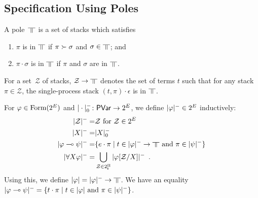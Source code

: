 \subsection{Specification Using Poles}


\begin{definition}
 \label{ex:def:pole}
A pole~$\bbot$ is a set of stacks
which satisfies
\begin{enumerate}
 \item \label{ex:red-closed} $\pi$ is in $\bbot$ if $\pi\succ \sigma$ and
       $\sigma\in\bbot$; and
 \item \label{ex:conc-closed} $\pi\cdot \sigma$ is in $\bbot$ if $\pi$
       and $\sigma$ are in $\bbot$.
\end{enumerate}
\end{definition}

For a set~$\mathcal Z$ of
stacks, $\mathcal Z\rightarrow\bbot$ denotes
the set of
terms
$t$ such that
for any
stack $\pi\in\mathcal Z$,
the single-process stack $(t,\pi)\cdot\epsilon$ is in $\bbot$.


For $\varphi\in\mathop{\text{Form}}(2^E)$ and $|\cdot|^-_0\colon\mathsf{PVar}\rightarrow 2^E$\kern
-2pt,
we define $|{\varphi}|^-\in
2^E$ inductively:
\begin{align*}
 \nsem{\mathcal Z} =& \mathcal Z \text{ for } \mathcal Z\in 2^E\\
 \nsem{X}=& |X|_0^- \\
 \nsem{\phi\limp\psi}=&
 \{e\cdot\pi\mid  t\in\nsem\phi\rightarrow\bbot
 \text{ and  }\pi\in\nsem\psi\}\\
 \nsem{\forall X\phi}=&
 \bigcup_{\mathcal Z\in 2^\sPi} \nsem{\phi[\mathcal Z/X]}\enspace.
\end{align*}
Using this, we define $\sem \phi=\nsem{\phi}\rightarrow\bbot$.
We have an equality
$|{\varphi\multimap\psi}|^- = \{t\cdot\pi\mid
t\in|{\varphi}|\text{ and }\pi\in|{\psi}|^-\}$.

